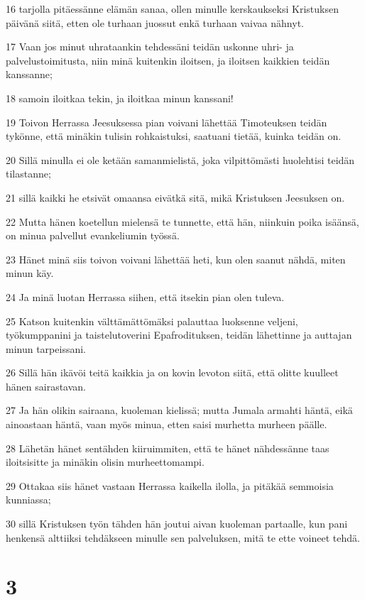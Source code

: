 \par 16 tarjolla pitäessänne elämän sanaa, ollen minulle kerskaukseksi Kristuksen päivänä siitä, etten ole turhaan juossut enkä turhaan vaivaa nähnyt.
\par 17 Vaan jos minut uhrataankin tehdessäni teidän uskonne uhri- ja palvelustoimitusta, niin minä kuitenkin iloitsen, ja iloitsen kaikkien teidän kanssanne;
\par 18 samoin iloitkaa tekin, ja iloitkaa minun kanssani!
\par 19 Toivon Herrassa Jeesuksessa pian voivani lähettää Timoteuksen teidän tykönne, että minäkin tulisin rohkaistuksi, saatuani tietää, kuinka teidän on.
\par 20 Sillä minulla ei ole ketään samanmielistä, joka vilpittömästi huolehtisi teidän tilastanne;
\par 21 sillä kaikki he etsivät omaansa eivätkä sitä, mikä Kristuksen Jeesuksen on.
\par 22 Mutta hänen koetellun mielensä te tunnette, että hän, niinkuin poika isäänsä, on minua palvellut evankeliumin työssä.
\par 23 Hänet minä siis toivon voivani lähettää heti, kun olen saanut nähdä, miten minun käy.
\par 24 Ja minä luotan Herrassa siihen, että itsekin pian olen tuleva.
\par 25 Katson kuitenkin välttämättömäksi palauttaa luoksenne veljeni, työkumppanini ja taistelutoverini Epafrodituksen, teidän lähettinne ja auttajan minun tarpeissani.
\par 26 Sillä hän ikävöi teitä kaikkia ja on kovin levoton siitä, että olitte kuulleet hänen sairastavan.
\par 27 Ja hän olikin sairaana, kuoleman kielissä; mutta Jumala armahti häntä, eikä ainoastaan häntä, vaan myös minua, etten saisi murhetta murheen päälle.
\par 28 Lähetän hänet sentähden kiiruimmiten, että te hänet nähdessänne taas iloitsisitte ja minäkin olisin murheettomampi.
\par 29 Ottakaa siis hänet vastaan Herrassa kaikella ilolla, ja pitäkää semmoisia kunniassa;
\par 30 sillä Kristuksen työn tähden hän joutui aivan kuoleman partaalle, kun pani henkensä alttiiksi tehdäkseen minulle sen palveluksen, mitä te ette voineet tehdä.

\chapter{3}

